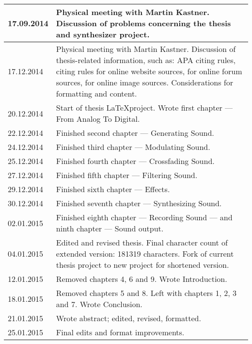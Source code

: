 \documentclass[12pt]{report}
\begin{document}
{\begin{tabular}{| p{2cm} | p{13cm} |}
  \hline
  17.09.2014 & Physical meeting with Martin Kastner. Discussion of problems concerning the thesis and synthesizer project. \\
  \hline
  17.12.2014 & Physical meeting with Martin Kastner. Discussion of thesis-related information, such as: APA citing rules, citing rules for online website sources, for online forum sources, for online image sources. Considerations for formatting and content. \\
  \hline
  20.12.2014 & Start of thesis \LaTeX project. Wrote first chapter --- From Analog To Digital. \\
  \hline
  22.12.2014 & Finished second chapter --- Generating Sound. \\
  \hline
  24.12.2014 & Finished third chapter --- Modulating Sound. \\
  \hline
  25.12.2014 & Finished fourth chapter --- Crossfading Sound. \\
  \hline
  27.12.2014 & Finished fifth chapter --- Filtering Sound. \\
  \hline
  29.12.2014 & Finished sixth chapter --- Effects. \\
  \hline
  30.12.2014 & Finished seventh chapter --- Synthesizing Sound. \\
  \hline
  02.01.2015 & Finished eighth chapter --- Recording Sound --- and ninth chapter --- Sound output. \\
  \hline
  04.01.2015 & Edited and revised thesis. Final character count of extended version: 181319 characters. Fork of current thesis project to new project for shortened version. \\
  \hline
  12.01.2015 & Removed chapters 4, 6 and 9. Wrote Introduction. \\
  \hline
  18.01.2015 & Removed chapters 5 and 8. Left with chapters 1, 2, 3 and 7. Wrote Conclusion. \\
  \hline
  21.01.2015 & Wrote abstract; edited, revised, formatted. \\
  \hline
  25.01.2015 & Final edits and format improvements. \\
  \hline
\end{tabular}

}
\end{document}
